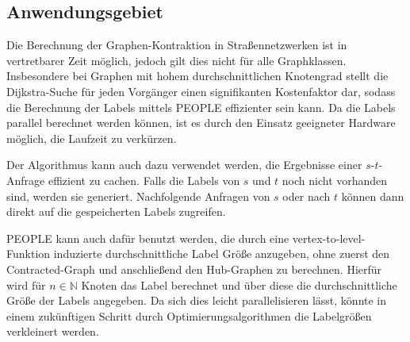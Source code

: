 \subsection{Anwendungsgebiet}

Die Berechnung der Graphen-Kontraktion in Straßennetzwerken ist in vertretbarer Zeit möglich, jedoch gilt dies nicht für alle Graphklassen.
Insbesondere bei Graphen mit hohem durchschnittlichen Knotengrad stellt die Dijkstra-Suche für jeden Vorgänger einen signifikanten Kostenfaktor dar, sodass die Berechnung der Labels mittels PEOPLE effizienter sein kann.
Da die Labels parallel berechnet werden können, ist es durch den Einsatz geeigneter Hardware möglich, die Laufzeit zu verkürzen.

Der Algorithmus kann auch dazu verwendet werden, die Ergebnisse einer $s$-$t$-Anfrage effizient zu cachen.
Falls die Labels von $s$ und $t$ noch nicht vorhanden sind, werden sie generiert.
Nachfolgende Anfragen von $s$ oder nach $t$ können dann direkt auf die gespeicherten Labels zugreifen.

PEOPLE kann auch dafür benutzt werden, die durch eine vertex-to-level-Funktion induzierte durchschnittliche Label Größe anzugeben, ohne zuerst den Contracted-Graph und anschließend den Hub-Graphen zu berechnen.
Hierfür wird für $n \in \mathbb{N}$ Knoten das Label berechnet und über diese die durchschnittliche Größe der Labels angegeben.
Da sich dies leicht parallelisieren lässt, könnte in einem zukünftigen Schritt durch Optimierungsalgorithmen die Labelgrößen verkleinert werden.
